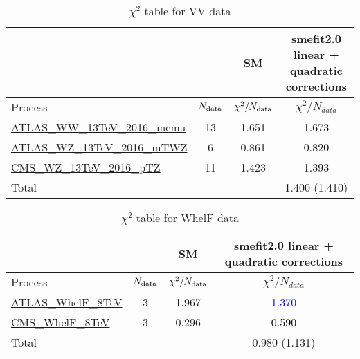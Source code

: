 \documentclass{article}
\begin{document}
\begin{table}[H]
\centering
\begin{tabular}{|l|c|c|c|}
\hline
 \multicolumn{2}{|c|}{} & SM& smefit2.0 linear + quadratic corrections\\ \hline
Process & $N_{\rm data}$ & $\chi^ 2/N_{\rm data}$& $\chi^ 2/N_{data}$\\ \hline
\href{https://arxiv.org/abs/1905.04242}{ATLAS_WW_13TeV_2016_memu} & 13 & 1.651 & \textcolor{black}                            {1.673} \\ \hline
\href{https://arxiv.org/abs/1902.05759}{ATLAS_WZ_13TeV_2016_mTWZ} & 6 & 0.861 & \textcolor{black}                            {0.820} \\ \hline
\href{https://arxiv.org/abs/1901.03428}{CMS_WZ_13TeV_2016_pTZ} & 11 & 1.423 & \textcolor{black}                            {1.393} \\ \hline
\hline Total & &  & 1.400 (1.410) \\ \hline
\end{tabular}
\caption{$\chi^2$ table for VV data}
\end{table}
\begin{table}[H]
\centering
\begin{tabular}{|l|c|c|c|}
\hline
 \multicolumn{2}{|c|}{} & SM& smefit2.0 linear + quadratic corrections\\ \hline
Process & $N_{\rm data}$ & $\chi^ 2/N_{\rm data}$& $\chi^ 2/N_{data}$\\ \hline
\href{https://arxiv.org/abs/1612.02577}{ATLAS_WhelF_8TeV} & 3 & 1.967 & \textcolor{blue}                            {1.370} \\ \hline
\href{https://arxiv.org/abs/1605.09047}{CMS_WhelF_8TeV} & 3 & 0.296 & \textcolor{black}                            {0.590} \\ \hline
\hline Total & &  & 0.980 (1.131) \\ \hline
\end{tabular}
\caption{$\chi^2$ table for WhelF data}
\end{table}
\end{document}
